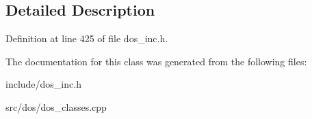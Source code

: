 \subsection{Detailed Description}


Definition at line 425 of file dos\-\_\-inc.\-h.



The documentation for this class was generated from the following files\-:\begin{DoxyCompactItemize}
\item 
include/dos\-\_\-inc.\-h\item 
src/dos/dos\-\_\-classes.\-cpp\end{DoxyCompactItemize}
